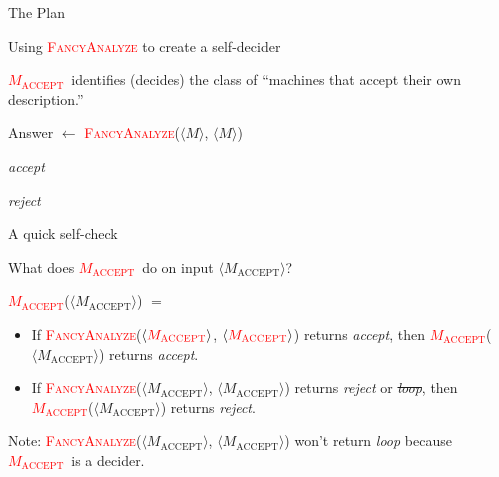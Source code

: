 \documentclass[12pt,compress]{beamer}
\newcommand{\func}[1]{\textcolor{red}{\textsc{#1}}}
\newcommand{\str}[1]{$\langle #1 \rangle$}
\newcommand{\MACC}[0]{\func{$M_{\text{ACCEPT}}$}}
\newcommand{\strMACC}[0]{$\langle M_{\text{ACCEPT}} \rangle$}
\begin{document}
\begin{frame}{The Plan}

  

\end{frame}

\begin{frame}{Using \func{FancyAnalyze} to create a self-decider}

  \MACC~identifies (decides) the class of ``machines
  that accept their own description.''

  \vskip 0.25in

  \begin{algorithmic}[0]
    \Function{\func{\MACC}}{\str{M}}

    \State Answer $\gets$ \func{FancyAnalyze}(\str{M}, \str{M})


    \Return \textit{accept}


    \Return \textit{reject}

    \EndIf

    \EndFunction
    
  \end{algorithmic}

\end{frame}

\begin{frame}{A quick self-check}

  What does \MACC~do on input \strMACC?

  \vskip 0.25in

  \MACC(\strMACC) $=$

  \begin{itemize}

  \item If \func{FancyAnalyze}(\str{\MACC}, \str{\MACC}) returns \textit{accept}, then
    \MACC(\strMACC) returns \textit{accept}.

  \item If \func{FancyAnalyze}(\strMACC, \strMACC) returns \textit{reject} or \st{\textit{loop}},
    then \MACC(\strMACC) returns \textit{reject}.

  \end{itemize}

  Note: \func{FancyAnalyze}(\strMACC, \strMACC) won't return \textit{loop}
  because \MACC~is a decider.

\end{frame}
\end{document}
